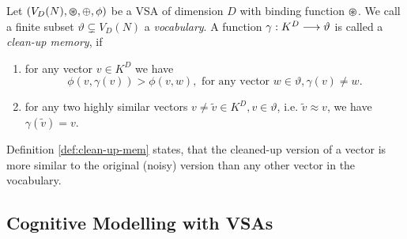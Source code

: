 \begin{defn}
\label{def:clean-up-mem}
	Let $(V_{D}(N), \varoast, \oplus, \phi)$ be a \acrfull{VSA} of dimension $D$ with binding function $\varoast$.
	We call a finite subset $\vartheta \subsetneq V_{D}(N)$ a \emph{vocabulary}.
	A function $\gamma: K^{D} \longrightarrow \vartheta$ is called a \emph{clean-up memory}, if 
	\begin{enumerate}
		\item for any vector $v\in K^{D}$ we have
		\[
		\phi\left(v, \gamma(v)\right) > \phi\left(v, w\right), \textrm{ for any vector } w \in \vartheta, \gamma(v) \neq w.
		\]
		\item for any two highly similar vectors $ v \neq \tilde{v} \in K^{D}, v \in \vartheta$, i.e. $\tilde{v} \approx v$, we have $\gamma(\tilde{v})=v$.
	\end{enumerate}
\end{defn}

Definition \ref{def:clean-up-mem} states, that the cleaned-up version of a vector is more similar to the original (noisy) version than any other vector in the vocabulary.


\subsection{Cognitive Modelling with \aclp{VSA}}
